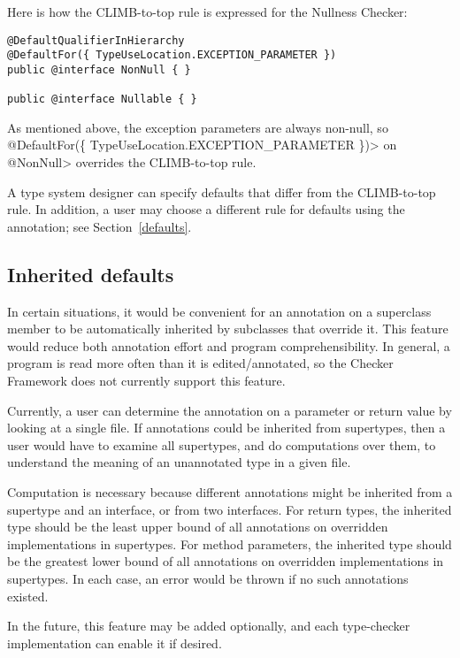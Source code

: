Here is how the CLIMB-to-top rule is expressed for the Nullness Checker:

\begin{Verbatim}
@DefaultQualifierInHierarchy
@DefaultFor({ TypeUseLocation.EXCEPTION_PARAMETER })
public @interface NonNull { }

public @interface Nullable { }
\end{Verbatim}

\noindent
 As mentioned above, the exception parameters are always non-null, so
\<@DefaultFor(\{ TypeUseLocation.EXCEPTION\_PARAMETER \})> on \<@NonNull> overrides
the CLIMB-to-top rule.

A type system designer can specify defaults that differ from the CLIMB-to-top rule.  In
addition, a user may choose a different rule for defaults using the
 annotation; see
Section~\ref{defaults}.


\subsection{Inherited defaults\label{inherited-defaults}}

In certain situations, it would be convenient for an annotation on a
superclass member to be automatically inherited by subclasses that override
it.  This feature would reduce both annotation effort and program
comprehensibility.  In general, a program is read more often than it is
edited/annotated, so the Checker Framework does not currently support this
feature.

Currently, a user can determine the annotation on a parameter or return
value by looking at a single file.  If annotations could be inherited from
supertypes, then a user would have to examine all supertypes, and do
computations over them, to understand the meaning of an unannotated type in
a given file.

Computation is necessary because different annotations might be inherited
from a supertype and an interface, or from two interfaces.  For return
types, the inherited type should be the least upper bound of all
annotations on overridden implementations in supertypes.  For method
parameters, the inherited type should be the greatest lower bound of all
annotations on overridden implementations in supertypes.  In each case, an
error would be thrown if no such annotations existed.

In the future, this feature may be added optionally, and each type-checker
implementation can enable it if desired.


